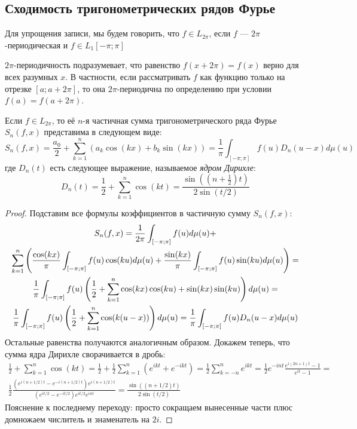 \subsection{Сходимость тригонометрических рядов Фурье}

\begin{note}
	Для упрощения записи, мы будем говорить, что $f \in L_{2\pi}$, если $f$ --- $2\pi$-периодическая и $f \in L_1[-\pi; \pi]$
\end{note}

\begin{anote}
	$2\pi$-периодичность подразумевает, что равенство $f(x + 2\pi) = f(x)$ верно для всех разумных $x$. В частности, если рассматривать $f$ как функцию только на отрезке $[a; a + 2\pi]$, то она $2\pi$-периодична по определению при условии $f(a) = f(a + 2\pi)$.
\end{anote}

\begin{lemma}
	Если $f \in L_{2\pi}$, то её $n$-я частичная сумма тригонометрического ряда Фурье $S_n(f, x)$ представима в следующем виде:
	\[
		S_n(f, x) = \frac{a_0}{2} + \sum_{k = 1}^n (a_k\cos(kx) + b_k\sin(kx)) = \frac{1}{\pi}\int_{[-\pi; \pi]} f(u)D_n(u - x)d\mu(u)
	\]
	где $D_n(t)$ есть следующее выражение, называемое \textit{ядром Дирихле}:
	\[
		D_n(t) = \frac{1}{2} + \sum_{k = 1}^n \cos(kt) = \frac{\sin((n + \frac{1}{2})t)}{2\sin(t / 2)}
	\]
\end{lemma}

\begin{proof}
	Подставим все формулы коэффициентов в частичную сумму $S_n(f, x)$:
	\begin{multline*}
		S_n(f, x) = \frac{1}{2\pi}\int_{[-\pi; \pi]} f(u)d\mu(u) +
		\\
		\sum_{k = 1}^n \left(\frac{\cos(kx)}{\pi}\int_{[-\pi; \pi]} f(u)\cos(ku)d\mu(u) + \frac{\sin(kx)}{\pi}\int_{[-\pi; \pi]} f(u)\sin(ku)d\mu(u)\right) =
		\\
		\frac{1}{\pi} \int_{[-\pi; \pi]} f(u)\left(\frac{1}{2} + \sum_{k = 1}^n \cos(kx)\cos(ku) + \sin(kx)\sin(ku)\right)d\mu(u) =
		\\
		\frac{1}{\pi} \int_{[-\pi; \pi]} f(u)\left(\frac{1}{2} + \sum_{k = 1}^n \cos(k(u - x))\right)d\mu(u) = \frac{1}{\pi} \int_{[-\pi; \pi]} f(u)D_n(u - x)d\mu(u)
	\end{multline*}
	Остальные равенства получаются аналогичным образом. Докажем теперь, что сумма ядра Дирихле сворачивается в дробь:
	\begin{multline*}
		\frac{1}{2} + \sum_{k = 1}^n \cos(kt) = \frac{1}{2} + \frac{1}{2}\sum_{k = 1}^n (e^{ikt} + e^{-ikt}) = \frac{1}{2} \sum_{k = -n}^n e^{ikt} = \frac{1}{2} e^{-int} \frac{e^{i(2n + 1)t} - 1}{e^{it} - 1} =
		\\
		\frac{1}{2}\frac{(e^{i(n + 1/2)t} - e^{-i(n + 1/2)t})e^{i(n + 1/2)t}}{(e^{it/2} - e^{-it/2})e^{it/2}e^{int}} = \frac{\sin((n + 1/2)t)}{2\sin(t/2)}
	\end{multline*}
	Пояснение к последнему переходу: просто сокращаем вынесенные части плюс домножаем числитель и знаменатель на $2i$.
\end{proof}

